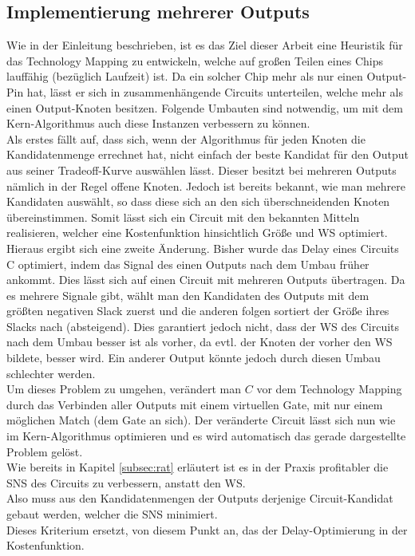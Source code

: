 \documentclass[11pt, a4paper, german]{article}
\newcommand{\TM}{Technology  Mapping }
\begin{document}
\subsection{Implementierung mehrerer Outputs}
\label{subsec:mehrere_outputs}
Wie in der Einleitung beschrieben, ist es das Ziel dieser Arbeit eine Heuristik für das \TM zu entwickeln, welche auf großen Teilen eines Chips lauffähig (bezüglich Laufzeit) ist. Da ein solcher Chip mehr als nur einen Output-Pin hat, lässt er sich in zusammenhängende Circuits unterteilen, welche mehr als einen Output-Knoten besitzen. Folgende Umbauten sind notwendig, um mit dem Kern-Algorithmus auch diese Instanzen verbessern zu können.\\

Als erstes fällt auf, dass sich, wenn der Algorithmus für jeden Knoten die Kandidatenmenge errechnet hat, nicht einfach der beste Kandidat für den Output aus seiner Tradeoff-Kurve auswählen lässt. Dieser besitzt bei mehreren Outputs nämlich in der Regel offene Knoten. 
Jedoch ist bereits bekannt, wie man mehrere Kandidaten auswählt, so dass diese sich an den sich überschneidenden Knoten übereinstimmen. Somit lässt sich ein Circuit mit den bekannten Mitteln realisieren, welcher eine Kostenfunktion hinsichtlich Größe und WS optimiert. \\

Hieraus ergibt sich eine zweite Änderung. Bisher wurde das Delay eines Circuits C optimiert, indem das Signal des einen Outputs nach dem Umbau früher ankommt. Dies lässt sich auf einen Circuit mit mehreren Outputs übertragen. Da es mehrere Signale gibt, wählt man den Kandidaten des Outputs mit dem größten negativen Slack zuerst und die anderen folgen sortiert der Größe ihres Slacks nach (absteigend). Dies garantiert jedoch nicht, dass der WS des Circuits nach dem Umbau besser ist als vorher, da evtl. der Knoten der vorher den WS bildete, besser wird. Ein anderer Output könnte jedoch durch diesen Umbau schlechter werden. \\
Um dieses Problem zu umgehen, verändert man $C$ vor dem \TM durch das Verbinden aller Outputs mit einem virtuellen Gate, mit nur einem möglichen Match (dem Gate an sich). Der veränderte Circuit lässt sich nun wie im Kern-Algorithmus optimieren und es wird automatisch das gerade dargestellte Problem gelöst.\\ 
Wie bereits in Kapitel \ref{subsec:rat}  erläutert ist es in der Praxis profitabler die SNS des Circuits zu verbessern, anstatt den WS.\\
Also muss aus den Kandidatenmengen der Outputs derjenige Circuit-Kandidat gebaut werden, welcher die SNS minimiert.\\
 Dieses Kriterium ersetzt, von diesem Punkt an,  das der Delay-Optimierung in der Kostenfunktion.\\
 
\end{document}
